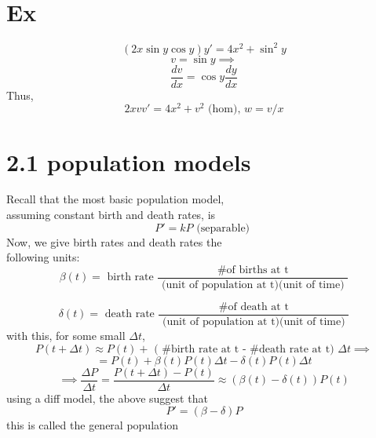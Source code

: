 \section*{Ex}
  \[ (2x \sin y \cos y ) y' = 4x^2 + \sin^2y \]
  \[ v = \sin y \implies\]
  \[ \frac{dv}{dx} = \cos y \frac{dy}{dx} \]
  Thus, 
  \[ 2xvv' = 4x^2 + v^2 \text{ (hom),  } w = v/x \]

\section{2.1 population models}
  Recall that the most basic population model, \\ 
  assuming constant birth and death rates, is 
  \[ P' = kP \text{ (separable)  } \]
  Now, we give birth rates and death rates the \\
  following units: 
  \[ \beta(t) = \text{ birth rate } \frac{ \text{ \# of births at t }}{
  \text{ (unit of population at t)(unit of time) }} \]

  \[ \delta(t) = \text{ death rate } \frac{ \text{ \# of death at t }}{
  \text{ (unit of population at t)(unit of time) }} \]
  with this, for some small \( \Delta t \), 
  \[ P(t + \Delta t) \approx P(t) + \text{ ( \# birth rate at t - \# death rate at t) } \Delta t \implies   \]
  \[ = P(t) + \beta (t) P(t) \Delta t - \delta (t) P(t) \Delta t \]
  \[ \implies \frac{ \Delta P}{ \Delta t} =  \frac{P(t + \Delta t) -P(t)}{ \Delta
  t}  \approx ( \beta(t) - \delta(t) ) P(t)  \]
  using a diff model, the above suggest that 
  \[ \boxed{ P' = (\beta - \delta ) P} \]
  this is called the general population 

